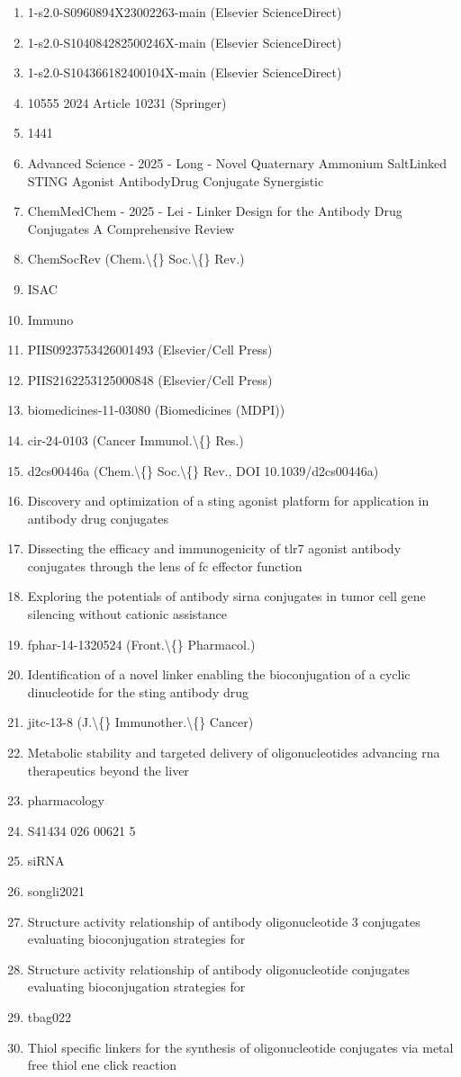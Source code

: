 \documentclass[10pt]{article}
\begin{document}
\begin{enumerate}\setlength{\itemsep}{0pt}\small
\item 1-s2.0-S0960894X23002263-main (Elsevier ScienceDirect)
\item 1-s2.0-S104084282500246X-main (Elsevier ScienceDirect)
\item 1-s2.0-S104366182400104X-main (Elsevier ScienceDirect)
\item 10555 2024 Article 10231 (Springer)
\item 1441
\item Advanced Science - 2025 - Long - Novel Quaternary Ammonium SaltLinked STING Agonist AntibodyDrug Conjugate  Synergistic
\item ChemMedChem - 2025 - Lei - Linker Design for the Antibody Drug Conjugates  A Comprehensive Review
\item ChemSocRev (Chem.\textbackslash\{\} Soc.\textbackslash\{\} Rev.)
\item ISAC
\item Immuno
\item PIIS0923753426001493 (Elsevier/Cell Press)
\item PIIS2162253125000848 (Elsevier/Cell Press)
\item biomedicines-11-03080 (Biomedicines (MDPI))
\item cir-24-0103 (Cancer Immunol.\textbackslash\{\} Res.)
\item d2cs00446a (Chem.\textbackslash\{\} Soc.\textbackslash\{\} Rev., DOI 10.1039/d2cs00446a)
\item Discovery and optimization of a sting agonist platform for application in antibody drug conjugates
\item Dissecting the efficacy and immunogenicity of tlr7 agonist antibody conjugates through the lens of fc effector function
\item Exploring the potentials of antibody sirna conjugates in tumor cell gene silencing without cationic assistance
\item fphar-14-1320524 (Front.\textbackslash\{\} Pharmacol.)
\item Identification of a novel linker enabling the bioconjugation of a cyclic dinucleotide for the sting antibody drug
\item jitc-13-8 (J.\textbackslash\{\} Immunother.\textbackslash\{\} Cancer)
\item Metabolic stability and targeted delivery of oligonucleotides advancing rna therapeutics beyond the liver
\item pharmacology
\item S41434 026 00621 5
\item siRNA
\item songli2021
\item Structure activity relationship of antibody oligonucleotide 3 conjugates evaluating bioconjugation strategies for
\item Structure activity relationship of antibody oligonucleotide conjugates evaluating bioconjugation strategies for
\item tbag022
\item Thiol specific linkers for the synthesis of oligonucleotide conjugates via metal free thiol ene click reaction
\end{enumerate}
\end{document}
